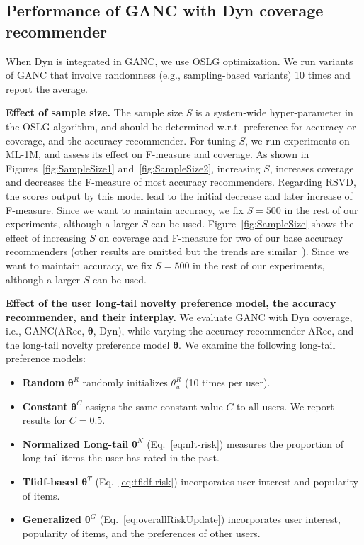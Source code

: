 \subsection{Performance of GANC with Dyn coverage recommender}
\label{sec:perfOSLG}
When Dyn is integrated in GANC, we use OSLG optimization. We run variants of GANC that involve   randomness (e.g., sampling-based variants) 10 times and report the average. 

\vspace{4mm}
\noindent \textbf{Effect of sample size. }The  sample size $S$ is a  system-wide hyper-parameter in the OSLG algorithm,  and should be determined w.r.t. preference for accuracy or coverage, and the accuracy recommender.  For tuning $S$, we run experiments on ML-1M, and  assess its effect   on F-measure  and coverage. 
\iffullpaper
As shown in Figures~\ref{fig:SampleSize1} and~\ref{fig:SampleSize2}, increasing $S$, increases coverage and decreases the F-measure of  most  accuracy recommenders.   Regarding RSVD, the scores output by this model lead to the initial decrease and later increase of  F-measure.  Since  we want  to maintain  accuracy, we fix $S=500$ in the rest of our experiments,  although a larger $S$ can be used. 
\else
Figure~\ref{fig:SampleSize} shows the effect of increasing $S$ on coverage and F-measure for two of our base accuracy recommenders (other results are omitted but the trends are similar~\cite{ourFullVersion}). Since  we want  to maintain  accuracy, we fix $S=500$ in the rest of our experiments,  although a larger $S$ can be used. 
\fi


\vspace{4mm}
\noindent \textbf{Effect of the user long-tail novelty preference model, the accuracy recommender, and their interplay. } 
We evaluate GANC with Dyn coverage, i.e., GANC(ARec, $\bm{\theta}$, Dyn),  while varying the accuracy recommender ARec, and the long-tail novelty preference model $\bm{\theta}$. We examine the following long-tail preference models: 
\begin{itemize}
\item \textbf{Random} $\bm{\theta}^{R}$ randomly initializes $\theta^{R}_u$ (10 times per user).%
\item \textbf{Constant} $\bm{\theta}^{C}$ assigns the same  constant value  $C$ to all users. We report results for $C=0.5$. %
\item \textbf{Normalized Long-tail} $\bm{\theta}^{N}$ (Eq.~\ref{eq:nlt-risk}) measures the proportion of long-tail items the user has rated in the past. 
\item \textbf{Tfidf-based} $\bm{\theta}^{T}$ (Eq.~\ref{eq:tfidf-risk}) incorporates user interest and popularity of items. 
\item \textbf{Generalized} $\bm{\theta}^{G}$  (Eq.~\ref{eq:overallRiskUpdate}) incorporates user interest, popularity of items, and the preferences of other users. 
\end{itemize}

